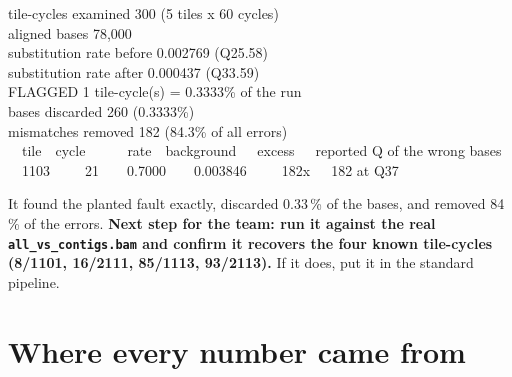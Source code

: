 \begin{center}
\begin{tcolorbox}[enhanced,width=0.95\textwidth,colback=ink,colframe=bio,boxrule=1pt,arc=3pt,
  fontupper=\ttfamily\scriptsize\color{white},left=9pt,right=9pt,top=8pt,bottom=8pt,
  title={\bfseries Actual output of the validation run},fonttitle=\bfseries\small,coltitle=white,colbacktitle=bio]
tile-cycles examined      300  (5 tiles x 60 cycles)\\
aligned bases             78,000\\
substitution rate  before 0.002769   (Q25.58)\\
substitution rate  after  0.000437   (Q33.59)\\[5pt]
FLAGGED 1 tile-cycle(s) = 0.3333\% of the run\\
\hspace*{2em}bases discarded      260 (0.3333\%)\\
\hspace*{2em}mismatches removed   182 (84.3\% of all errors)\\[5pt]
\hspace*{2em}~~tile~~cycle~~~~~~rate~~background~~~excess~~~reported Q of the wrong bases\\
\hspace*{2em}~~1103~~~~~21~~~~0.7000~~~~0.003846~~~~~182x~~~182 at Q37
\end{tcolorbox}
\end{center}
\vspace{-2pt}
\begin{center}\begin{minipage}{0.93\textwidth}\footnotesize\color{slate}
It found the planted fault exactly, discarded 0.33\,\% of the bases, and removed 84\,\% of the
errors. \textbf{Next step for the team: run it against the real \texttt{all\_vs\_contigs.bam} and
confirm it recovers the four known tile-cycles (8/1101, 16/2111, 85/1113, 93/2113).} If it does, put
it in the standard pipeline.
\end{minipage}\end{center}

\clearpage
\renewcommand{\sectioncolor}{slate}
\section{Where every number came from}

